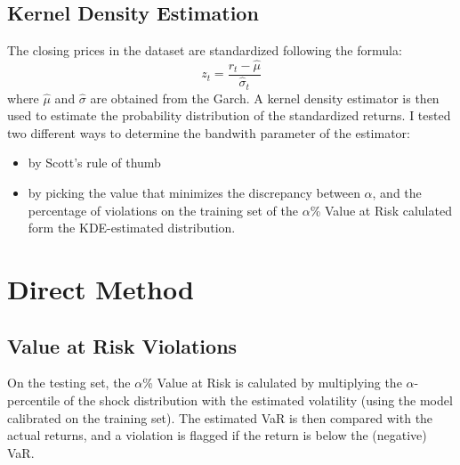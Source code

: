 \documentclass[12pt]{article}
\begin{document}
 \subsection{Kernel Density Estimation}
    The closing prices in the dataset are standardized following the formula:
    \begin{equation}
        z_t = \frac{r_t - \hat \mu}{\hat \sigma_t}
    \end{equation}
    where $\hat \mu$ and $\hat \sigma$ are obtained from the Garch.
    A kernel density estimator is then used to estimate the probability distribution of the standardized returns.
    I tested two different ways to determine the bandwith parameter of the estimator:
    \begin{itemize}
        \item by Scott’s rule of thumb
        \item by picking the value that minimizes the discrepancy between $\alpha$, and the percentage of violations on the training set of the $\alpha$\% Value at Risk calulated form the KDE-estimated distribution.
    \end{itemize}


    \section{Direct Method} \label{sec:direct}
    \subsection{Value at Risk Violations}
        On the testing set, the $\alpha$\% Value at Risk is calulated by multiplying the $\alpha$-percentile of the shock distribution with the estimated volatility (using the model calibrated on the training set).
        The estimated VaR is then compared with the actual returns, and a violation is flagged if the return is below the (negative) VaR.
\end{document}
